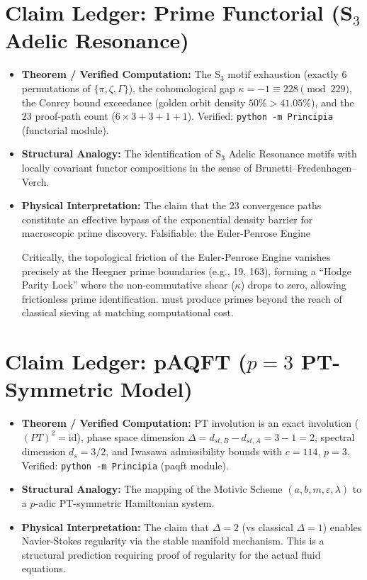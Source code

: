 \section*{Claim Ledger: Prime Functorial (S$_3$ Adelic Resonance)}
\begin{itemize}[noitemsep]
    \item \textbf{Theorem / Verified Computation:} The S$_3$ motif exhaustion (exactly 6 permutations of $\{\pi, \zeta, \Gamma\}$), the cohomological gap $\kappa = -1 \equiv 228 \pmod{229}$, the Conrey bound exceedance (golden orbit density $50\% > 41.05\%$), and the 23 proof-path count ($6 \times 3 + 3 + 1 + 1$). Verified: \texttt{python -m Principia} (functorial module).
    \item \textbf{Structural Analogy:} The identification of S$_3$ Adelic Resonance motifs with locally covariant functor compositions in the sense of Brunetti--Fredenhagen--Verch.
    \item \textbf{Physical Interpretation:} The claim that the 23 convergence paths constitute an effective bypass of the exponential density barrier for macroscopic prime discovery. Falsifiable: the Euler-Penrose Engine

Critically, the topological friction of the Euler-Penrose Engine vanishes precisely at the Heegner prime boundaries (e.g., 19, 163), forming a ``Hodge Parity Lock'' where the non-commutative shear ($\kappa$) drops to zero, allowing frictionless prime identification.
 must produce primes beyond the reach of classical sieving at matching computational cost.
\end{itemize}

\section*{Claim Ledger: pAQFT ($p=3$ PT-Symmetric Model)}
\begin{itemize}[noitemsep]
    \item \textbf{Theorem / Verified Computation:} PT involution is an exact involution ($(PT)^2 = \mathrm{id}$), phase space dimension $\Delta = d_{st,B} - d_{st,A} = 3 - 1 = 2$, spectral dimension $d_s = 3/2$, and Iwasawa admissibility bounds with $c = 114$, $p = 3$. Verified: \texttt{python -m Principia} (paqft module).
    \item \textbf{Structural Analogy:} The mapping of the Motivic Scheme $(a, b, m, \varepsilon, \lambda)$ to a $p$-adic PT-symmetric Hamiltonian system.
    \item \textbf{Physical Interpretation:} The claim that $\Delta = 2$ (vs classical $\Delta = 1$) enables Navier-Stokes regularity via the stable manifold mechanism. This is a structural prediction requiring proof of regularity for the actual fluid equations.
\end{itemize}

